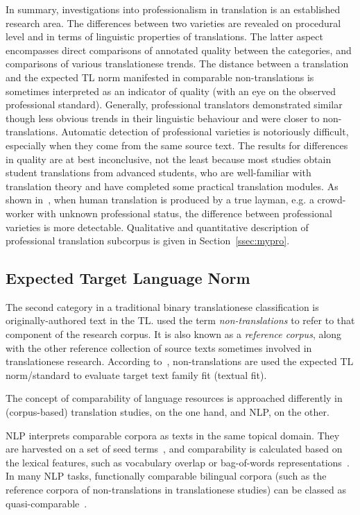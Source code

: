 In summary, investigations into professionalism in translation is an established research area. The differences between two varieties are revealed on procedural level and in terms of linguistic properties of translations. The latter aspect encompasses direct comparisons of annotated quality between the categories, and comparisons of various translationese trends. The distance between a translation and the expected TL norm manifested in comparable non-translations is sometimes interpreted as an indicator of quality (with an eye on the observed professional standard). Generally, professional translators demonstrated similar though less obvious trends in their linguistic behaviour and were closer to non-translations. Automatic detection of professional varieties is notoriously difficult, especially when they come from the same source text. The results for differences in quality are at best inconclusive, not the least because most studies obtain student translations from advanced students, who are well-familiar with translation theory and have completed some practical translation modules. As shown in~\citet{Popovic2020}, when human translation is produced by a true layman, e.g. a crowd-worker with unknown professional status, the difference between professional varieties is more detectable. Qualitative and quantitative description of professional translation subcorpus is given in Section~\ref{ssec:mypro}.

\subsection{\label{ssec:norm}Expected Target Language Norm}
The second category in a traditional binary translationese classification is originally-authored text in the TL. \citet{Chesterman2004} used the term \textit{non-translations} to refer to that component of the research corpus. It is also known as a \textit{reference corpus}, along with the other reference collection of source texts sometimes involved in translationese research. According to~\citet{Chesterman2004}, non-translations are used the expected TL norm/standard to evaluate target text family fit (textual fit).

The concept of comparability of language resources is approached differently in (corpus-based) translation studies, on the one hand, and \gls{NLP}, on the other. 

NLP interprets comparable corpora as texts in the same topical domain. They are harvested on a set of seed terms~\cite{Kilgarriff2011}, and comparability is calculated based on the lexical features, such as vocabulary overlap or bag-of-words representations~\cite{Li2018}. In many NLP tasks, functionally comparable bilingual corpora (such as the reference corpora of non-translations in translationese studies) can be classed as quasi-comparable~\cite[see, for example, ``non-aligned, and non-translated bilingual documents that could either be on the same topic (in-topic) or not (off-topic)'' in ][p.1051]{Fung2004}. 

